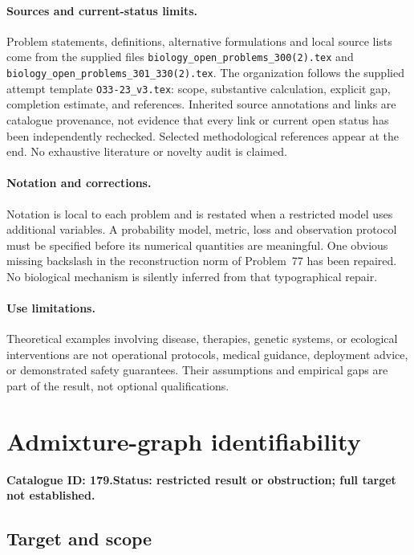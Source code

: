 \documentclass[11pt]{article}
\begin{document}
\paragraph{Sources and current-status limits.}
Problem statements, definitions, alternative formulations and local source lists
come from the supplied files
\texttt{biology\_open\_problems\_300(2).tex} and
\texttt{biology\_open\_problems\_301\_330(2).tex}.
The organization follows the supplied attempt template
\texttt{O33-23\_v3.tex}: scope, substantive calculation, explicit gap,
completion estimate, and references. Inherited source annotations and links are
catalogue provenance, not evidence that every link or current open status has
been independently rechecked. Selected methodological references appear at the
end. No exhaustive literature or novelty audit is claimed.

\paragraph{Notation and corrections.}
Notation is local to each problem and is restated when a restricted model uses
additional variables. A probability model, metric, loss and observation protocol
must be specified before its numerical quantities are meaningful. One obvious
missing backslash in the reconstruction norm of Problem~77 has been repaired.
No biological mechanism is silently inferred from that typographical repair.

\paragraph{Use limitations.}
Theoretical examples involving disease, therapies, genetic systems, or ecological
interventions are not operational protocols, medical guidance, deployment advice,
or demonstrated safety guarantees. Their assumptions and empirical gaps are part
of the result, not optional qualifications.

\setcounter{section}{178}
\section{Admixture-graph identifiability}
\label{prob:179}
\noindent\textbf{Catalogue ID: 179.}\quad \textbf{Status: restricted result or obstruction; full target not established.}
\subsection{Target and scope}
\end{document}
